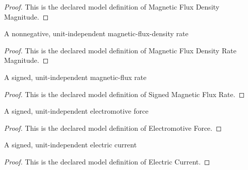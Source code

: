 \begin{proof}
  This is the declared model definition of Magnetic Flux Density Magnitude.
\end{proof}
\begin{definition}
  \label{def:physics:phyx-mini-0935:phyxminiproblems-problemphyxmini0935-magneticfluxdensityratemagnitude}
  A nonnegative, unit-independent magnetic-flux-density rate
\end{definition}
\begin{proof}
  This is the declared model definition of Magnetic Flux Density Rate Magnitude.
\end{proof}
\begin{definition}
  \label{def:physics:phyx-mini-0935:phyxminiproblems-problemphyxmini0935-signedmagneticfluxrate}
  A signed, unit-independent magnetic-flux rate
\end{definition}
\begin{proof}
  This is the declared model definition of Signed Magnetic Flux Rate.
\end{proof}
\begin{definition}
  \label{def:physics:phyx-mini-0935:phyxminiproblems-problemphyxmini0935-electromotiveforce}
  A signed, unit-independent electromotive force
\end{definition}
\begin{proof}
  This is the declared model definition of Electromotive Force.
\end{proof}
\begin{definition}
  \label{def:physics:phyx-mini-0935:phyxminiproblems-problemphyxmini0935-electriccurrent}
  A signed, unit-independent electric current
\end{definition}
\begin{proof}
  This is the declared model definition of Electric Current.
\end{proof}
